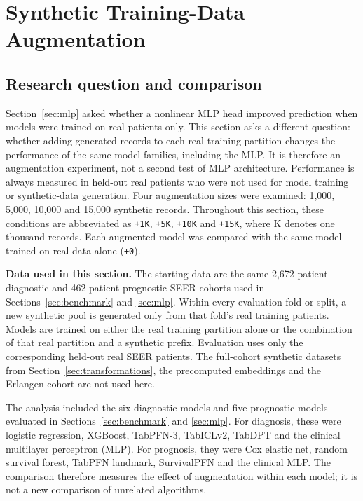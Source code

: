 \section{Synthetic Training-Data Augmentation}
\label{sec:augmentation}

\subsection{Research question and comparison}

Section~\ref{sec:mlp} asked whether a nonlinear MLP head improved prediction
when models were trained on real patients only. This section asks a different
question: whether adding generated records to each real training partition
changes the performance of the same model families, including the MLP. It is
therefore an augmentation experiment, not a second test of MLP architecture.
Performance is always measured in held-out real patients who were not used for
model training or synthetic-data generation. Four augmentation sizes were examined: 1,000,
5,000, 10,000 and 15,000 synthetic records.  Throughout this section, these
conditions are abbreviated as \texttt{+1K}, \texttt{+5K}, \texttt{+10K} and
\texttt{+15K}, where K denotes one thousand records.  Each augmented model was
compared with the same model trained on real data alone (\texttt{+0}).

\noindent\textbf{Data used in this section.} The starting data are the same
2,672-patient diagnostic and 462-patient prognostic SEER cohorts used in
Sections~\ref{sec:benchmark} and \ref{sec:mlp}. Within every evaluation fold or
split, a new synthetic pool is generated only from that fold's real training
patients. Models are trained on either the real training partition alone or the
combination of that real partition and a synthetic prefix. Evaluation uses only
the corresponding held-out real SEER patients. The full-cohort synthetic
datasets from Section~\ref{sec:transformations}, the precomputed embeddings and
the Erlangen cohort are not used here.

The analysis included the six diagnostic models and five prognostic models
evaluated in Sections~\ref{sec:benchmark} and \ref{sec:mlp}.  For diagnosis,
these were logistic regression, XGBoost, TabPFN-3, TabICLv2, TabDPT and the
clinical multilayer perceptron (MLP).  For prognosis, they were Cox elastic net,
random survival forest, TabPFN landmark, SurvivalPFN and the clinical MLP.  The
comparison therefore measures the effect of augmentation within each model; it
is not a new comparison of unrelated algorithms.

